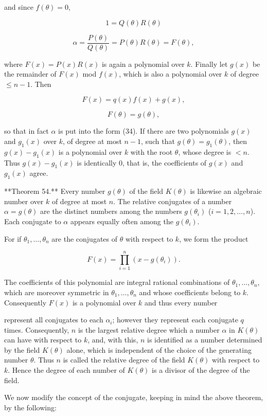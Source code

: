 and since $f(\theta) = 0$,

$$1 = Q(\theta)R(\theta)$$

$$\alpha = \frac{P(\theta)}{Q(\theta)} = P(\theta)R(\theta) = F(\theta),$$

where $F(x) = P(x)R(x)$ is again a polynomial over $k$. Finally let $g(x)$ be the remainder of $F(x)$ mod $f(x)$, which is also a polynomial over $k$ of degree $\leq n - 1$. Then

$$F(x) = q(x)f(x) + g(x),$$

$$F(\theta) = g(\theta),$$

so that in fact $\alpha$ is put into the form (34). If there are two polynomials $g(x)$ and $g_1(x)$ over $k$, of degree at most $n - 1$, such that $g(\theta) = g_1(\theta)$, then $g(x) - g_1(x)$ is a polynomial over $k$ with the root $\theta$, whose degree is $< n$. Thus $g(x) - g_1(x)$ is identically 0, that is, the coefficients of $g(x)$ and $g_1(x)$ agree.

**Theorem 54.** Every number $g(\theta)$ of the field $K(\theta)$ is likewise an algebraic number over $k$ of degree at most $n$. The relative conjugates of a number $\alpha = g(\theta)$ are the distinct numbers among the numbers $g(\theta_i)$ ($i = 1, 2, \ldots, n$). Each conjugate to $\alpha$ appears equally often among the $g(\theta_i)$.

For if $\theta_1, \ldots, \theta_n$ are the conjugates of $\theta$ with respect to $k$, we form the product

$$F(x) = \prod_{i=1}^{n} (x - g(\theta_i)).$$

The coefficients of this polynomial are integral rational combinations of $\theta_1, \ldots, \theta_n$, which are moreover symmetric in $\theta_1, \ldots, \theta_n$ and whose coefficients belong to $k$. Consequently $F(x)$ is a polynomial over $k$ and thus every number

represent all conjugates to each $\alpha_i$; however they represent each conjugate $q$ times. Consequently, $n$ is the largest relative degree which a number $\alpha$ in $K(\theta)$ can have with respect to $k$, and, with this, $n$ is identified as a number determined by the field $K(\theta)$ alone, which is independent of the choice of the generating number $\theta$. Thus $n$ is called the relative degree of the field $K(\theta)$ with respect to $k$. Hence the degree of each number of $K(\theta)$ is a divisor of the degree of the field.

We now modify the concept of the conjugate, keeping in mind the above theorem, by the following:

